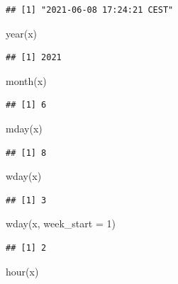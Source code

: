 \documentclass[
]{book}
\newenvironment{Shaded}{\begin{snugshade}}{\end{snugshade}}
\newcommand{\AttributeTok}[1]{\textcolor[rgb]{0.77,0.63,0.00}{#1}}
\newcommand{\DecValTok}[1]{\textcolor[rgb]{0.00,0.00,0.81}{#1}}
\newcommand{\FunctionTok}[1]{\textcolor[rgb]{0.00,0.00,0.00}{#1}}
\newcommand{\NormalTok}[1]{#1}
\begin{document}
\begin{verbatim}
## [1] "2021-06-08 17:24:21 CEST"
\end{verbatim}

\begin{Shaded}
\begin{Highlighting}[]
\FunctionTok{year}\NormalTok{(x)}
\end{Highlighting}
\end{Shaded}

\begin{verbatim}
## [1] 2021
\end{verbatim}

\begin{Shaded}
\begin{Highlighting}[]
\FunctionTok{month}\NormalTok{(x)}
\end{Highlighting}
\end{Shaded}

\begin{verbatim}
## [1] 6
\end{verbatim}

\begin{Shaded}
\begin{Highlighting}[]
\FunctionTok{mday}\NormalTok{(x)}
\end{Highlighting}
\end{Shaded}

\begin{verbatim}
## [1] 8
\end{verbatim}

\begin{Shaded}
\begin{Highlighting}[]
\FunctionTok{wday}\NormalTok{(x)}
\end{Highlighting}
\end{Shaded}

\begin{verbatim}
## [1] 3
\end{verbatim}

\begin{Shaded}
\begin{Highlighting}[]
\FunctionTok{wday}\NormalTok{(x, }\AttributeTok{week\_start =} \DecValTok{1}\NormalTok{)}
\end{Highlighting}
\end{Shaded}

\begin{verbatim}
## [1] 2
\end{verbatim}

\begin{Shaded}
\begin{Highlighting}[]
\FunctionTok{hour}\NormalTok{(x)}
\end{Highlighting}
\end{Shaded}
\end{document}
